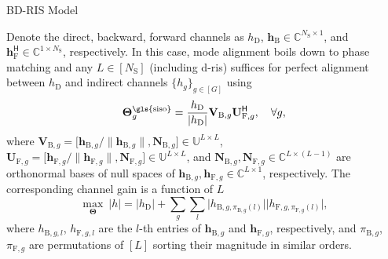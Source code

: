 \begin{section}{BD-RIS Model}

	\begin{example}\label{eg:siso_gain}
		Denote the direct, backward, forward channels as $h_\mathrm{D}$, $\mathbf{h}_\mathrm{B} \in \mathbb{C}^{N_\mathrm{S} \times 1}$, and $\mathbf{h}_\mathrm{F}^\mathsf{H} \in \mathbb{C}^{1 \times N_\mathrm{S}}$, respectively.
		In this case, mode alignment boils down to phase matching and any $L \in [N_\mathrm{S}]$ (including \gls{d}-\gls{ris}) suffices for perfect alignment between $h_\mathrm{D}$ and indirect channels $\{h_g\}_{g \in [G]}$ using
		\begin{equation}
			\mathbf{\Theta}_g^\textnormal{\gls{siso}} = \frac{h_\mathrm{D}}{\lvert h_\mathrm{D} \rvert} \mathbf{V}_{\mathrm{B},g} \mathbf{U}_{\mathrm{F},g}^\mathsf{H}, \quad \forall g,
			\label{eq:scattering_siso}
		\end{equation}
		where $\mathbf{V}_{\mathrm{B},g} = \bigl[\mathbf{h}_{\mathrm{B},g}/\lVert \mathbf{h}_{\mathrm{B},g} \rVert, \mathbf{N}_{\mathrm{B},g}\bigr] \in \mathbb{U}^{L \times L}$, $\mathbf{U}_{\mathrm{F},g} = \bigl[\mathbf{h}_{\mathrm{F},g}/\lVert \mathbf{h}_{\mathrm{F},g} \rVert, \mathbf{N}_{\mathrm{F},g}\bigr] \in \mathbb{U}^{L \times L}$, and $\mathbf{N}_{\mathrm{B},g}, \mathbf{N}_{\mathrm{F},g} \in \mathbb{C}^{L \times (L-1)}$ are orthonormal bases of null spaces of $\mathbf{h}_{\mathrm{B},g}, \mathbf{h}_{\mathrm{F},g} \in \mathbb{C}^{L \times 1}$, respectively.
		The corresponding channel gain is a function of $L$
		\begin{equation}
			\max_\mathbf{\Theta} \ \lvert h \rvert = \lvert h_\mathrm{D} \rvert + \sum_g \sum_l \lvert h_{\mathrm{B},g,\pi_{\mathrm{B},g}(l)} \rvert \lvert h_{\mathrm{F},g,\pi_{\mathrm{F},g}(l)} \rvert,
			\label{eq:gain_siso}
		\end{equation}
		where $h_{\mathrm{B},g,l}$, $h_{\mathrm{F},g,l}$ are the $l$-th entries of $\mathbf{h}_{\mathrm{B},g}$ and $\mathbf{h}_{\mathrm{F},g}$, respectively, and $\pi_{\mathrm{B},g}$, $\pi_{\mathrm{F},g}$ are permutations of $[L]$ sorting their magnitude in similar orders.

\end{example}
\end{section}
